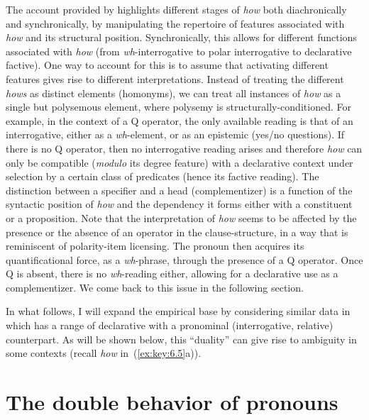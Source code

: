 \documentclass[output=paper]{langsci/langscibook}
\begin{document}
\largerpage
The account provided by \citet{vanGelderen2015} highlights different stages of
\emph{how} both diachronically and synchronically, by manipulating the
repertoire of features associated with \emph{how} and its structural position.
Synchronically, this allows for different functions associated with \emph{how}
(from \emph{wh}-interrogative to polar interrogative to declarative factive). One way
to account for this is to assume that activating different features gives rise
to different interpretations. Instead of treating the different \emph{hows} as
distinct elements (homonyms), we can treat all instances of \emph{how} as a
single but polysemous element, where polysemy is structurally-conditioned. For
example, in the context of a Q operator, the only available reading is that of
an interrogative, either as a \emph{wh}-element, or as an epistemic (yes/no
questions). If there is no Q operator, then no interrogative reading arises and
therefore \emph{how} can only be compatible (\emph{modulo} its degree feature)
with a declarative context under selection by a certain class of predicates
(hence its factive reading). The distinction between a specifier and a head
(complementizer) is a function of the syntactic position of \emph{how} and the
dependency it forms either with a constituent or a proposition. Note that the
interpretation of \emph{how} seems to be affected by the presence or the
absence of an operator in the clause-structure, in a way that is reminiscent of
polarity-item licensing. The pronoun then acquires its quantificational force,
as a \emph{wh}-phrase, through the presence of a Q operator. Once Q is absent, there
is no \emph{wh}-reading either, allowing for a declarative use as a complementizer. We
come back to this issue in the following section.

In what follows, I will expand the empirical base by considering similar data
in  which has a range of declarative  with a
pronominal (interrogative, relative) counterpart. As will be shown below, this
\enquote{duality} can give rise to ambiguity in some contexts (recall
\emph{how} in~(\ref{ex:key:6.5}a)).

\section{The double behavior of pronouns}\label{sec:double-pron}
\end{document}
